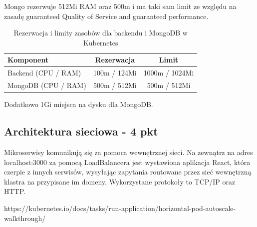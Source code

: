 \documentclass[12pt,a4paper]{article}
\begin{document}
Mongo rezerwuje 512Mi RAM oraz 500m i ma taki sam limit ze względu na zasadę guaranteed Quality of Service and guaranteed performance.

\begin{table}[H]
    \centering
    \begin{tabular}{|l|c|c|}
        \hline
        \textbf{Komponent} & \textbf{Rezerwacja} & \textbf{Limit} \\
        \hline
        Backend (CPU / RAM) & 100m / 124Mi & 1000m / 1024Mi \\
        \hline
        MongoDB (CPU / RAM) & 500m / 512Mi & 500m / 512Mi \\
        \hline
    \end{tabular}
    \caption{Rezerwacja i limity zasobów dla backendu i MongoDB w Kubernetes}
    \label{tab:resource-limits}
\end{table}
Dodatkowo 1Gi miejsca na dysku dla MongoDB.

\subsection{Architektura sieciowa - 4 pkt}
\label{sec:ExampleResults}



Mikroserwisy komunikują się za pomoca wewnętrznej sieci. Na zewnątrz na adres localhost:3000 za pomocą LoadBalancera jest wystawiona aplikacja React, która czerpie z innych serwisów, wysyłając zapytania routowane przez sieć wewnętrzną klastra na przypisane im domeny. Wykorzystane protokoły to TCP/IP oraz HTTP.
\noindent





https://kubernetes.io/docs/tasks/run-application/horizontal-pod-autoscale-walkthrough/

\nocite{*}
\end{document}

